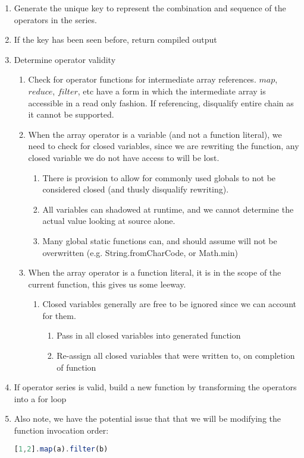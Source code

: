 \documentclass{article}
\begin{document}
  \begin{enumerate}
    \item Generate the unique key to represent the combination and sequence of the operators in the series.  
    \item If the key has been seen before, return compiled output    
    \item Determine operator validity
    \begin {enumerate}
      \item Check for operator functions for intermediate array references. 
        $map$, $reduce$, $filter$, etc have a form in which the intermediate array 
        is accessible in a read only fashion.  If referencing, disqualify entire chain as
        it cannot be supported.
      \item When the array operator is a variable (and not a function literal), we need to check for closed 
        variables, since we are rewriting the function, any closed variable we do not have access to 
        will be lost.  
      \begin{enumerate}
        \item There is provision to allow for commonly used globals to not be considered closed 
          (and thusly disqualify rewriting).  
        \item All variables can shadowed at runtime, and we cannot determine
          the actual value looking at source alone. 
        \item Many global static functions can, and should assume will not be overwritten (e.g. String.fromCharCode, or Math.min)
      \end{enumerate}
      \item When the array operator is a function literal, it is in the scope of the current function, this gives 
        us some leeway. 
      \begin{enumerate}
        \item Closed variables generally are free to be ignored since we can account for them.
        \begin{enumerate}
          \item Pass in all closed variables into generated function
          \item Re-assign all closed variables that were written to, on completion of function
        \end{enumerate}
      \end{enumerate}
    \end{enumerate}
    \item If operator series is valid, build a new function by transforming the operators into a for loop
    \item Also note, we have the potential issue that that we will be modifying the function invocation order:
        \begin{lstlisting}[language=JavaScript] 
          [1,2].map(a).filter(b) 
        \end{lstlisting}


\end{enumerate}
\end{document}
